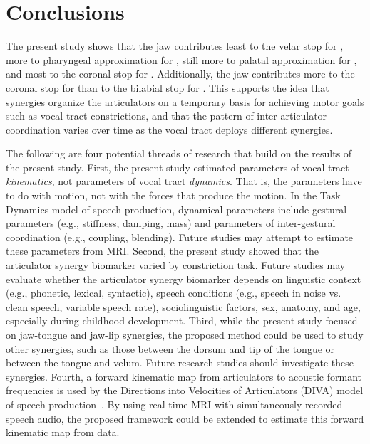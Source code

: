 \documentclass[preprint]{JASAnew}\usepackage[]{graphicx}\usepackage[]{color}
\begin{document}
\section{Conclusions}
\label{sec:conclusions}

The present study shows that the jaw contributes 
least to the velar stop for \textipa{[k]},
more to pharyngeal approximation for \textipa{[A]}, 
still more to palatal approximation for \textipa{[i]},
and most to the coronal stop for \textipa{[t]}.
Additionally, the jaw contributes more to the coronal stop for \textipa{[t]} than to the bilabial stop for \textipa{[p]}.
%
This supports the idea that synergies organize the articulators on a temporary basis for achieving motor goals such as vocal tract constrictions, and that the pattern of inter-articulator coordination varies over time as the vocal tract deploys different synergies. 




The following are four potential threads of research that build on the results of the present study.
%
First, the present study estimated parameters of vocal tract \textit{kinematics}, not parameters of vocal tract \textit{dynamics}. That is, the parameters have to do with motion, not with the forces that produce the motion. In the Task Dynamics model of speech production, dynamical parameters include gestural parameters (e.g., stiffness, damping, mass) and parameters of inter-gestural coordination (e.g., coupling, blending). Future studies may attempt to estimate these parameters from MRI.
%
Second, the present study showed that the articulator synergy biomarker varied by constriction task. Future studies may evaluate whether the articulator synergy biomarker depends on linguistic context (e.g., phonetic, lexical, syntactic), speech conditions (e.g., speech in noise vs. clean speech, variable speech rate), sociolinguistic factors, sex, anatomy, and age, especially during childhood development.
%
Third, while the present study focused on jaw-tongue and jaw-lip synergies, the proposed method could be used to study other synergies, such as those between the dorsum and tip of the tongue or between the tongue and velum. Future research studies should investigate these synergies.
%
Fourth, a forward kinematic map from articulators to acoustic formant frequencies is used by the Directions into Velocities of Articulators (DIVA) model of speech production~\cite{guenther1995speech}. By using real-time MRI with simultaneously recorded speech audio, the proposed framework could be extended to estimate this forward kinematic map from data.
\end{document}
